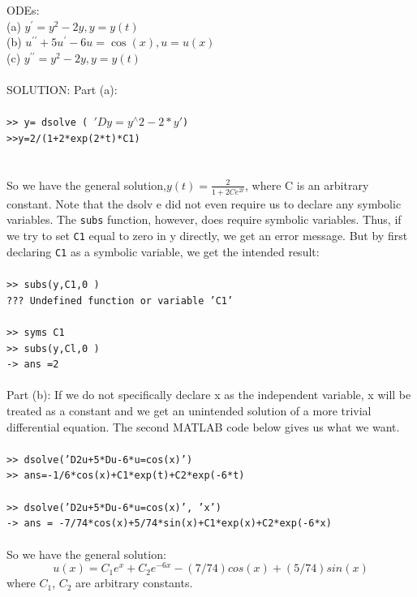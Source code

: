 \documentclass[../main.tex]{subfiles}
\begin{document}
ODEs:\\
(a) $y^{\prime}=y^{2}-2 y, y=y(t)$\\
(b) $u^{\prime \prime}+5 u^{\prime}-6 u=\cos (x), u=u(x)$\\
(c) $y^{\prime \prime}=y^{2}-2 y, y=y(t)$\\
\\
SOLUTION: Part (a): 
\\
\\
\texttt{>> y= dsolve ( $'Dy=y^{\wedge}2-2*y'$) }\\
\texttt{>>y=2/(1+2*exp(2*t)*C1) }\\
\\
\\
So we have the general solution,$y(t)=\frac{2}{1+2 C e^{2 t}}$,  where C is an arbitrary 
constant. Note that the dsolv e did not even require us to declare any symbolic 
variables. The \texttt{subs} function, however, does require symbolic variables. Thus, if 
we try to set \texttt{C1} equal to zero in y directly, we get an error message. But by first 
declaring \texttt{C1} as a symbolic variable, we get the intended result:
\\
\\
\texttt{>> subs(y,C1,0 ) }\\
\texttt{??? Undefined function or variable 'C1'}\\
\\
\texttt{>> syms C1 }\\
\texttt{>> subs(y,Cl,0 )}\\
\texttt{-> ans =2 
}\\
\\
Part (b): If we do not specifically declare x as the independent variable, x will be 
treated as a constant and we get an unintended solution of a more trivial 
differential equation. The second MATLAB code below gives us what we want. 
\\
\\
\texttt{>> dsolve('D2u+5*Du-6*u=cos(x)') 
}\\
\texttt{>> ans=-1/6*cos(x)+C1*exp(t)+C2*exp(-6*t) }\\
\\
\texttt{>> dsolve('D2u+5*Du-6*u=cos(x)', 'x') 
}\\
\texttt{-> ans = -7/74*cos(x)+5/74*sin(x)+C1*exp(x)+C2*exp(-6*x) }\\
\\
So we have the general solution: 
$$
u(x) = C_1e^x+C_2e^{-6x}-(7/74)cos(x)+(5/74)sin(x) 
$$
where $C_1$, $C_2$ are arbitrary constants.
\\
\end{document}
